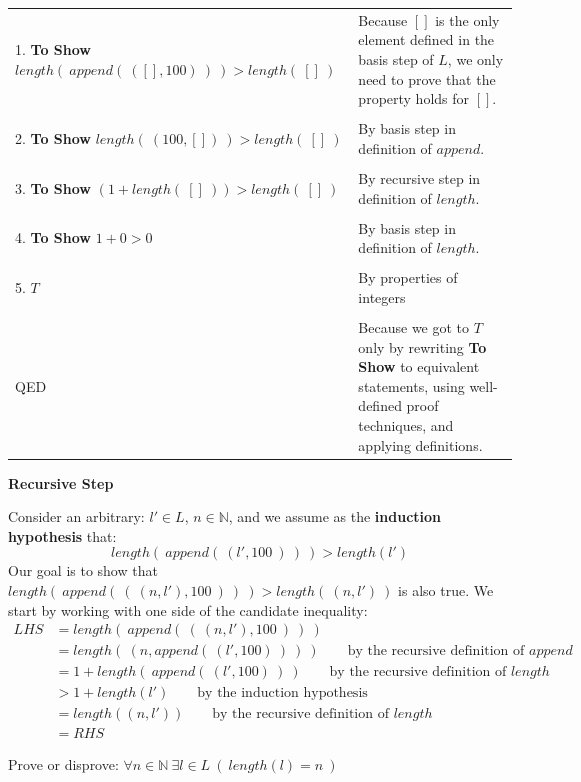\documentclass[12pt, oneside]{article}
\begin{document}
    \begin{tabular}{l p{3.5in}}
     1. \textbf{To Show} $length(~append(~([], 100)~)~) > length(~[]~)$
    & Because $[]$ is the only element defined in the basis step of $L$, 
    we only need to prove that the property holds for $[]$.\\
    &  \\
     2. \textbf{To Show} $length(~(100,[])~) > length(~[]~)$
    &  By basis step in definition of $append$.\\
    &  \\
     3. \textbf{To Show} $(1 +length(~[]~)) > length(~[]~)$
    &  By recursive step in definition of $length$.\\
    &  \\    
     4. \textbf{To Show} $1+0 > 0$
    &  By basis step in definition of $length$.\\
    &  \\    
    5. $T$
    & By properties of integers \\
    &  \\    
    QED & Because we got to $T$ only by rewriting \textbf{To Show} to equivalent statements, using well-defined proof techniques, and applying definitions. \\
    \end{tabular}

{\bf Recursive Step}

Consider an arbitrary: $l' \in L$, $n \in \mathbb{N}$, and we  assume
as the {\bf induction hypothesis} that:
\[
length(~append(~(l', 100~)~)~) > length(l')
\]
Our goal is to show that $length(~append( ~(~(n,l'), 100~)~)~) > length(~(n,l')~)$ is also true. 
We start by working with
one side of the candidate inequality:
\begin{align*}
LHS &= length(~append( ~(~ (n,l'), 100~)~)~) \\
&= length(~(n, append(~(l', 100)~)~ )~) \qquad \text{by the recursive definition of $append$}\\
&= 1 + length(~ append(~(l', 100)~) ~) \qquad \text{by the recursive definition of $length$}\\
&> 1+ length(l')  \qquad \text{by the induction hypothesis}\\
&= length( (n,l') )  \qquad \text{by the recursive definition of $length$}\\
&= RHS 
\end{align*} \newpage


Prove or disprove: $\forall n \in \mathbb{N} ~\exists l \in L ~(~length(l) = n~)$

\vspace{300pt} 
\end{document}
